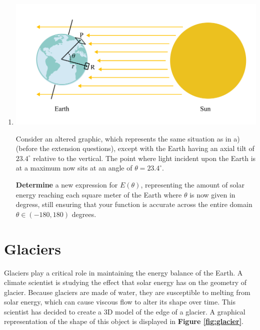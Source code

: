 \documentclass{exam}
\begin{document}
\begin{enumerate}
\begin{enumerate}
    
        \item 
    
        \begin{centering}
            \includegraphics[scale=1]{sunrayqb.png}
        \end{centering}
        
        Consider an altered graphic, which represents the same situation as in a) (before the extension questions), except with the Earth having an axial tilt of $23.4^\circ$ relative to the vertical. The point where light incident upon the Earth is at a maximum now sits at an angle of $\theta=23.4^\circ$. 
        
        \textbf{Determine} a new expression for $E(\theta)$, representing the amount of solar energy reaching each square meter of the Earth where $\theta$ is now given in degress, still ensuring that your function is accurate across the entire domain $\theta \in (-180,180)$ degrees.
        


        
    \end{enumerate}

    
\end{enumerate}

\newpage

\section{Glaciers}


Glaciers play a critical role in maintaining the energy balance of the Earth. A climate scientist is studying the effect that solar energy has on the geometry of glacier. Because glaciers are made of water, they are susceptible to melting from solar energy, which can cause viscous flow to alter its shape over time. This scientist has decided to create a 3D model of the edge of a glacier. A graphical representation of the shape of this object is displayed in \textbf{Figure \ref{fig:glacier}}.
\end{document}
